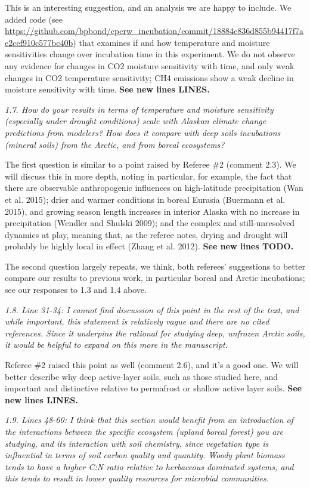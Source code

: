 \documentclass[11pt, oneside]{article}
\begin{document}
This is an interesting suggestion, and an analysis we are happy to include. We added code (see \url{https://github.com/bpbond/cpcrw_incubation/commit/18884c836d855b94417f7ae2cef910c577bc40b}) that examines if and how temperature and moisture sensitivities change over incubation time in this experiment. We do not observe any evidence for changes in CO2 moisture sensitivity with time, and only weak changes in CO2 temperature sensitivity; CH4 emissions show a weak decline in moisture sensitivity with time. {\bf See new lines LINES.}

\medskip
{\it 1.7. How do your results in terms of temperature and moisture sensitivity (especially under drought conditions) scale with Alaskan climate change predictions from modelers? How does it compare with deep soils incubations (mineral soils) from the Arctic, and from boreal ecosystems? }

The first question is similar to a point raised by Referee \#2 (comment 2.3). We will discuss this in more depth, noting in particular, for example, the fact that there are observable anthropogenic influences on high-latitude precipitation (Wan et al. 2015); drier and warmer conditions in boreal Eurasia (Buermann et al. 2015), and growing season length increases in interior Alaska with no increase in precipitation (Wendler and Shulski 2009); and the complex and still-unresolved dynamics at play, meaning that, as the referee notes, drying and drought will probably be highly local in effect (Zhang et al. 2012). {\bf See new lines TODO.}

The second question largely repeats, we think, both referees' suggestions to better compare our results to previous work, in particular boreal and Arctic incubations; see our responses to 1.3 and 1.4 above.

\medskip
{\it 1.8. Line 31-34: I cannot find discussion of this point in the rest of the text, and while important, this statement is relatively vague and there are no cited references. Since it underpins the rational for studying deep, unfrozen Arctic soils, it would be helpful to expand on this more in the manuscript. }

Referee \#2 raised this point as well (comment 2.6), and it's a good one. We will better describe why deep active-layer soils, such as those studied here, and important and distinctive relative to permafrost or shallow active layer soils.  {\bf See new lines LINES.}

\medskip
{\it 1.9. Lines 48-60: I think that this section would benefit from an introduction of the interactions between the specific ecosystem (upland boreal forest) you are studying, and its interaction with soil chemistry, since vegetation type is influential in terms of soil carbon quality and quantity. Woody plant biomass tends to have a higher C:N ratio relative to herbaceous dominated systems, and this tends to result in lower quality resources for microbial communities. }
\end{document}
